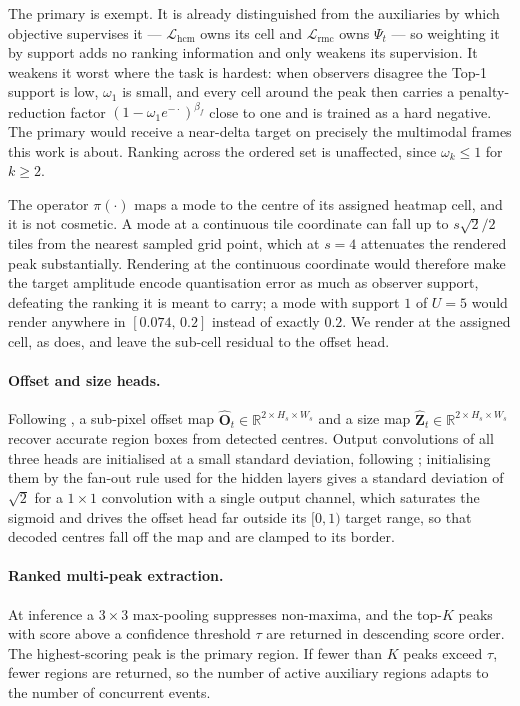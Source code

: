 \documentclass[preprint,12pt]{elsarticle}
\begin{document}
The primary is exempt. It is already distinguished from the auxiliaries by
which objective supervises it — $\mathcal{L}_{\text{hcm}}$ owns its cell and
$\mathcal{L}_{\text{rmc}}$ owns $\Psi_t$ — so weighting it by support adds no
ranking information and only weakens its supervision. It weakens it worst
where the task is hardest: when observers disagree the Top-1 support is low,
$\omega_1$ is small, and every cell around the peak then carries a
penalty-reduction factor $(1-\omega_1 e^{-\cdot})^{\beta_f}$ close to one and
is trained as a hard negative. The primary would receive a near-delta target on
precisely the multimodal frames this work is about. Ranking across the ordered
set is unaffected, since $\omega_k \le 1$ for $k \ge 2$.

The operator $\pi(\cdot)$ maps a mode to the centre of its assigned heatmap
cell, and it is not cosmetic. A mode at a continuous tile coordinate can fall
up to $s\sqrt{2}/2$ tiles from the nearest sampled grid point, which at
$s = 4$ attenuates the rendered peak substantially. Rendering at the
continuous coordinate would therefore
make the target amplitude encode quantisation error as much as observer
support, defeating the ranking it is meant to carry; a mode with support $1$ of
$U=5$ would render anywhere in $[0.074,\,0.2]$ instead of exactly $0.2$. We
render at the assigned cell, as \cite{zhou2019objects} does, and leave the
sub-cell residual to the offset head.

\paragraph{Offset and size heads.} Following \cite{zhou2019objects},
a sub-pixel offset map $\hat{\mathbf{O}}_t \in \mathbb{R}^{2 \times H_s
\times W_s}$ and a size map $\hat{\mathbf{Z}}_t \in \mathbb{R}^{2 \times
H_s \times W_s}$ recover accurate region boxes from detected centres. Output
convolutions of all three heads are initialised at a small standard deviation,
following \cite{zhou2019objects}; initialising them by the fan-out rule used
for the hidden layers gives a standard deviation of $\sqrt{2}$ for a
$1{\times}1$ convolution with a single output channel, which saturates the
sigmoid and drives the offset head far outside its $[0,1)$ target range, so
that decoded centres fall off the map and are clamped to its border.

\paragraph{Ranked multi-peak extraction.} At inference a $3{\times}3$
max-pooling suppresses non-maxima, and the top-$K$ peaks with score above a
confidence threshold $\tau$ are returned in descending score order. The
highest-scoring peak is the primary region. If fewer than $K$ peaks exceed
$\tau$, fewer regions are returned, so the number of active auxiliary regions
adapts to the number of concurrent events.
\end{document}
